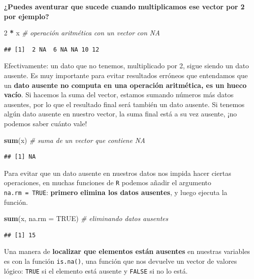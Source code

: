 \documentclass[11pt,]{book}
\newenvironment{Shaded}{\begin{snugshade}}{\end{snugshade}}
\newcommand{\CommentTok}[1]{\textcolor[rgb]{0.37,0.37,0.37}{\textit{#1}}}
\newcommand{\DataTypeTok}[1]{\textcolor[rgb]{0.27,0.27,0.27}{#1}}
\newcommand{\DecValTok}[1]{\textcolor[rgb]{0.06,0.06,0.06}{#1}}
\newcommand{\KeywordTok}[1]{\textcolor[rgb]{0.27,0.27,0.27}{\textbf{#1}}}
\newcommand{\NormalTok}[1]{#1}
\newcommand{\OperatorTok}[1]{\textcolor[rgb]{0.43,0.43,0.43}{\textbf{#1}}}
\newcommand{\OtherTok}[1]{\textcolor[rgb]{0.37,0.37,0.37}{#1}}
\newcommand{\StringTok}[1]{\textcolor[rgb]{0.5,0.5,0.5}{#1}}
\begin{document}
\textbf{¿Puedes aventurar que sucede cuando multiplicamos ese vector por 2 por ejemplo?}

\begin{Shaded}
\begin{Highlighting}[]
\DecValTok{2} \OperatorTok{*}\StringTok{ }\NormalTok{x }\CommentTok{# operación aritmética con un vector con NA}
\end{Highlighting}
\end{Shaded}

\begin{verbatim}
## [1]  2 NA  6 NA NA 10 12
\end{verbatim}

Efectivamente: un dato que no tenemos, multiplicado por 2, sigue siendo un dato ausente. Es muy importante para evitar resultados erróneos que entendamos que un \textbf{dato ausente no computa en una operación aritmética, es un hueco vacío}. Si hacemos la suma del vector, estamos sumando números más datos ausentes, por lo que el resultado final será también un dato ausente. Si tenemos algún dato ausente en nuestro vector, la suma final está a su vez ausente, ¡no podemos saber cuánto vale!

\begin{Shaded}
\begin{Highlighting}[]
\KeywordTok{sum}\NormalTok{(x) }\CommentTok{# suma de un vector que contiene NA}
\end{Highlighting}
\end{Shaded}

\begin{verbatim}
## [1] NA
\end{verbatim}

Para evitar que un dato ausente en nuestros datos nos impida hacer ciertas operaciones, en muchas funciones de \texttt{R} podemos añadir el argumento \texttt{na.rm\ =\ TRUE}: \textbf{primero elimina los datos ausentes}, y luego ejecuta la función.

\begin{Shaded}
\begin{Highlighting}[]
\KeywordTok{sum}\NormalTok{(x, }\DataTypeTok{na.rm =} \OtherTok{TRUE}\NormalTok{) }\CommentTok{# eliminando datos ausentes}
\end{Highlighting}
\end{Shaded}

\begin{verbatim}
## [1] 15
\end{verbatim}

Una manera de \textbf{localizar que elementos están ausentes} en nuestras variables es con la función \texttt{is.na()}, una función que nos devuelve un vector de valores lógico: \texttt{TRUE} si el elemento está ausente y \texttt{FALSE} si no lo está.
\end{document}
